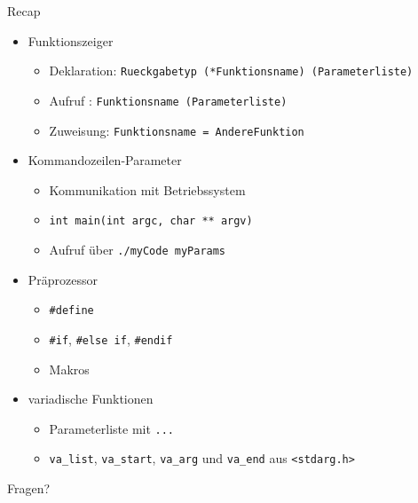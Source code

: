 
\begin{frame}[t,plain]
\titlepage
\end{frame}


\begin{frame}[fragile]{Recap}
%
\begin{itemize}
\item Funktionszeiger
	\begin{itemize}
	\item Deklaration:	\tabto{4cm}	\texttt{Rueckgabetyp (*Funktionsname) (Parameterliste)}
	\item Aufruf	:			\tabto{4cm}	\texttt{Funktionsname (Parameterliste)}
	\item Zuweisung:		\tabto{4cm}	\texttt{Funktionsname = AndereFunktion}
	\end{itemize}
\item Kommandozeilen-Parameter
	\begin{itemize}
	\item Kommunikation mit Betriebssystem
	\item \texttt{int main(int argc, char ** argv)}
	\item Aufruf über \texttt{./myCode myParams}
	\end{itemize}
\end{itemize}
%
\begin{minipage}{.49\linewidth}
\begin{itemize}
\item Präprozessor
	\begin{itemize}
	\item \texttt{#define}
	\item \texttt{#if}, \texttt{#else if}, \texttt{#endif}
	\item Makros
	\end{itemize}
\end{itemize}
\end{minipage}
%
%
\begin{minipage}{.49\linewidth}
\begin{itemize}
\item variadische Funktionen
	\begin{itemize}
	\item Parameterliste mit \texttt{...}
	\item \texttt{va\_list}, \texttt{va\_start}, \texttt{va\_arg} und \texttt{va\_end} aus \texttt{<stdarg.h>}
	\end{itemize}
\end{itemize}
\end{minipage}
%
\begin{center}
Fragen?
\end{center}

%
\end{frame}

